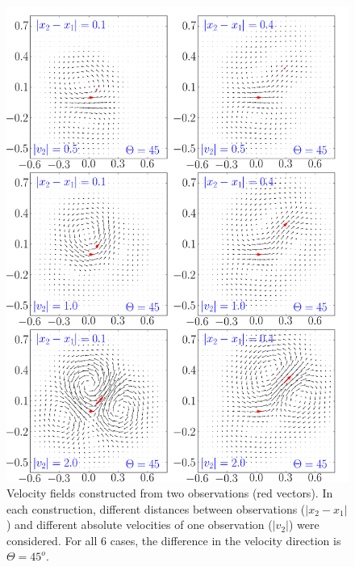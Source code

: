 \documentclass[12pt,a4paper]{article}%
\begin{document}
\begin{figure}
\centering\includegraphics[width=36pc]{plots/2_vectors_angle_45.png}
\caption{Velocity fields constructed from two observations (red vectors). 
In each construction,  different distances between observations ($|x_2 - x_1|$) 
and different absolute velocities of one observation ($|v_2|$) were considered. 
For all 6 cases, the difference in the velocity direction is $\Theta=45^o$. }
\label{2-vec-45}
\end{figure}
\end{document}
